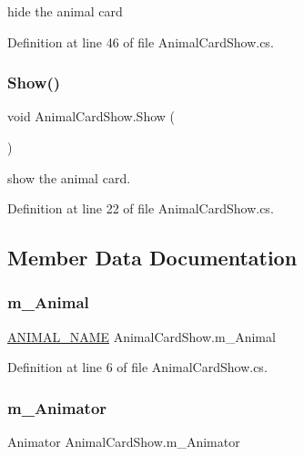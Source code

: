 hide the animal card 



Definition at line 46 of file Animal\+Card\+Show.\+cs.

\mbox{\label{class_animal_card_show_a2376232de20980281decc3e0e1745271}} 
\subsubsection{\texorpdfstring{Show()}{Show()}}
{\footnotesize\ttfamily void Animal\+Card\+Show.\+Show (\begin{DoxyParamCaption}{ }\end{DoxyParamCaption})}



show the animal card. 



Definition at line 22 of file Animal\+Card\+Show.\+cs.



\subsection{Member Data Documentation}
\mbox{\label{class_animal_card_show_a3dd2cd8c28f6817578e36550365b9e79}} 
\subsubsection{\texorpdfstring{m\+\_\+\+Animal}{m\_Animal}}
{\footnotesize\ttfamily \mbox{\hyperlink{_animal_8cs_a2fa5713399b84d1b88dae9196837af50}{A\+N\+I\+M\+A\+L\+\_\+\+N\+A\+ME}} Animal\+Card\+Show.\+m\+\_\+\+Animal}



Definition at line 6 of file Animal\+Card\+Show.\+cs.

\mbox{\label{class_animal_card_show_a50bb4af7e1242d54cc8c11d909512a40}} 
\subsubsection{\texorpdfstring{m\+\_\+\+Animator}{m\_Animator}}
{\footnotesize\ttfamily Animator Animal\+Card\+Show.\+m\+\_\+\+Animator}



